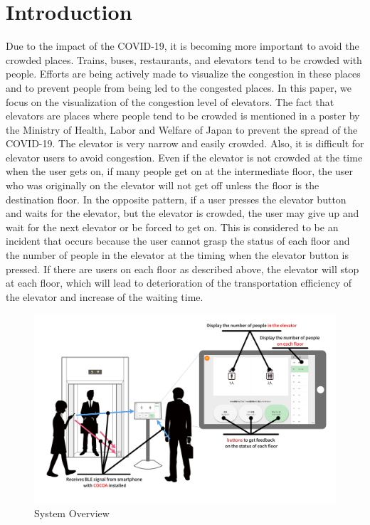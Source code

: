 \section{Introduction}
Due to the impact of the COVID-19, it is becoming more important to avoid the crowded places. Trains, buses, restaurants, and elevators tend to be crowded with people. Efforts are being actively made to visualize the congestion in these places and to prevent people from being led to the congested places. In this paper, we focus on the visualization of the congestion level of elevators. The fact that elevators are places where people tend to be crowded is mentioned in a poster by the Ministry of Health, Labor and Welfare of Japan to prevent the spread of the COVID-19\cite{ministry}. The elevator is very narrow and easily crowded. Also, it is difficult for elevator users to avoid congestion. Even if the elevator is not crowded at the time when the user gets on, if many people get on at the intermediate floor, the user who was originally on the elevator will not get off unless the floor is the destination floor. In the opposite pattern, if a user presses the elevator button and waits for the elevator, but the elevator is crowded, the user may give up and wait for the next elevator or be forced to get on. This is considered to be an incident that occurs because the user cannot grasp the status of each floor and the number of people in the elevator at the timing when the elevator button is pressed. If there are users on each floor as described above, the elevator will stop at each floor, which will lead to deterioration of the transportation efficiency of the elevator and increase of the waiting time.


\begin{figure}[t]
  \begin{center}
    \includegraphics[clip, width=1.0\hsize]{img/system.png}
    \caption{System Overview}
    \label{fig:system}
  \end{center}
\end{figure}


